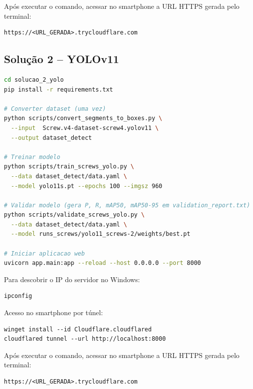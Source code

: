 \documentclass[12pt,a4paper]{article}
\begin{document}
Após executar o comando, acessar no smartphone a URL HTTPS gerada pelo terminal:

\begin{verbatim}
https://<URL_GERADA>.trycloudflare.com
\end{verbatim}

\subsection{Solu\c{c}\~ao 2 -- YOLOv11}

\begin{lstlisting}[language=bash, caption={Prepara\c{c}\~ao e execu\c{c}\~ao da Solu\c{c}\~ao 2}]
cd solucao_2_yolo
pip install -r requirements.txt

# Converter dataset (uma vez)
python scripts/convert_segments_to_boxes.py \
  --input  Screw.v4-dataset-screw4.yolov11 \
  --output dataset_detect

# Treinar modelo
python scripts/train_screws_yolo.py \
  --data dataset_detect/data.yaml \
  --model yolo11s.pt --epochs 100 --imgsz 960

# Validar modelo (gera P, R, mAP50, mAP50-95 em validation_report.txt)
python scripts/validate_screws_yolo.py \
  --data dataset_detect/data.yaml \
  --model runs_screws/yolo11_screws-2/weights/best.pt

# Iniciar aplicacao web
uvicorn app.main:app --reload --host 0.0.0.0 --port 8000
\end{lstlisting}

Para descobrir o IP do servidor no Windows:

\begin{lstlisting}[caption={Verificar IP local do servidor}]
ipconfig
\end{lstlisting}

Acesso no smartphone por túnel:

\begin{lstlisting}[caption={Criar túnel público para acesso via smartphone}]
winget install --id Cloudflare.cloudflared
cloudflared tunnel --url http://localhost:8000
\end{lstlisting}

Após executar o comando, acessar no smartphone a URL HTTPS gerada pelo terminal:

\begin{verbatim}
https://<URL_GERADA>.trycloudflare.com
\end{verbatim}

\end{document}
